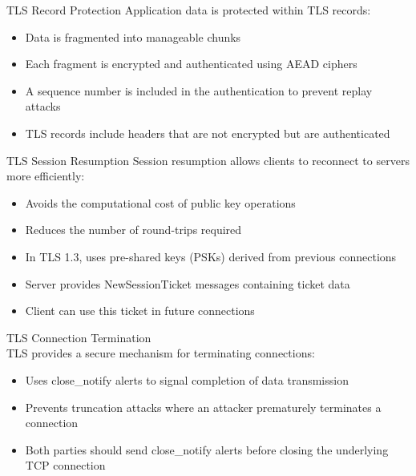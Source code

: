 \multend


\begin{concept}{TLS Record Protection}
Application data is protected within TLS records:
\begin{itemize}
    \item Data is fragmented into manageable chunks
    \item Each fragment is encrypted and authenticated using AEAD ciphers
    \item A sequence number is included in the authentication to prevent replay attacks
    \item TLS records include headers that are not encrypted but are authenticated
\end{itemize}
\end{concept}


\begin{definition}{TLS Session Resumption}
Session resumption allows clients to reconnect to servers more efficiently:
\begin{itemize}
    \item Avoids the computational cost of public key operations
    \item Reduces the number of round-trips required
    \item In TLS 1.3, uses pre-shared keys (PSKs) derived from previous connections
    \item Server provides NewSessionTicket messages containing ticket data
    \item Client can use this ticket in future connections
\end{itemize}
\end{definition}

\begin{concept}{TLS Connection Termination}\\
TLS provides a secure mechanism for terminating connections:
\begin{itemize}
    \item Uses close\_notify alerts to signal completion of data transmission
    \item Prevents truncation attacks where an attacker prematurely terminates a connection
    \item Both parties should send close\_notify alerts before closing the underlying TCP connection
\end{itemize}
\end{concept}




